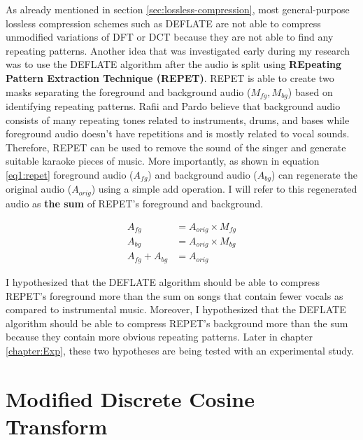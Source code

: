 As already mentioned in section \ref{sec:lossless-compression}, most general-purpose lossless compression schemes such as DEFLATE\cite{Deutsch1996rfc1951} are not able to compress unmodified variations of DFT or DCT because they are not able to find any repeating patterns. Another idea that was investigated early during my research was to use the DEFLATE algorithm after the audio is split using \textbf{REpeating Pattern Extraction Technique (REPET)}\cite{Rafii2013repet}. REPET is able to create two masks separating the foreground and background audio ($M_{fg} ,  M_{bg}$) based on identifying  repeating patterns. Rafii and Pardo believe that background audio consists of many repeating tones related to instruments, drums, and bases while foreground audio doesn't have repetitions and is mostly related to vocal sounds. Therefore, REPET can be used to remove the sound of the singer and generate suitable karaoke pieces of music. More importantly, as shown in equation \ref{eq1:repet} foreground audio ($A_{fg}$) and background audio ($A_{bg}$) can regenerate the original audio ($A_{orig}$) using a simple add operation. I will refer to this regenerated audio as \textbf{the sum} of REPET's foreground and background.

\begin{equation}
\label{eq1:repet}
\begin{aligned} 
A_{fg} &= A_{orig} \times M_{fg} \\
A_{bg} &= A_{orig} \times M_{bg} \\
A_{fg} + A_{bg} &= A_{orig}
\end{aligned}
\end{equation}

I hypothesized that the DEFLATE algorithm should be able to compress REPET's foreground more than the sum on songs that contain fewer vocals as compared to instrumental music. Moreover, I hypothesized that the DEFLATE algorithm should be able to compress REPET's background more than the sum because they contain more obvious repeating patterns. Later in chapter \ref{chapter:Exp}, these two hypotheses are being tested with an experimental study.

\section{Modified Discrete Cosine Transform}
\label{sec:mdct}

